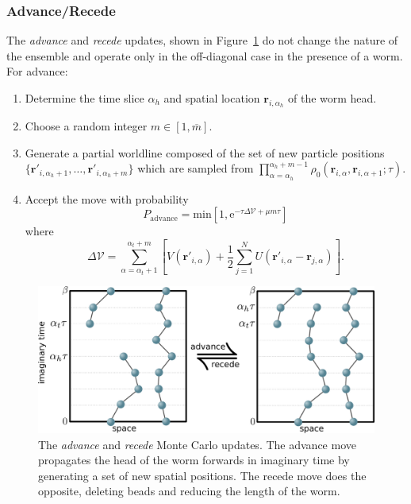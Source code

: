 \documentclass[prb,10pt,aps,floatfix,notitlepage]{revtex4-1}
\renewcommand{\vec}[1]{\boldsymbol{#1}}
\newcommand{\e}[1]{\mathrm{e}^{#1}}
\begin{document}
\subsubsection{Advance/Recede}
The \emph{advance} and \emph{recede} updates, shown in
 Figure~\ref{fig:advancerecede} do not change the nature of the
ensemble and operate only in the off-diagonal case in the presence of a worm.
For advance:
\begin{enumerate}
    \item Determine the time slice $\alpha_h$ and spatial location
        $\vec{r}_{i,\alpha_h}$ of the worm head.
    \item Choose a random integer $m \in [1,\overline{m}]$.
    \item Generate a partial worldline composed of the set of new particle positions 
        $\{\vec{r}'_{i,\alpha_h+1},\ldots, \vec{r}'_{i,\alpha_h+m}\}$ which are
        sampled from $\prod_{\alpha=\alpha_h}^{\alpha_h+m-1}
    \rho_0(\vec{r}_{i,\alpha},\vec{r}_{i,\alpha+1};\tau)$.
\item Accept the move with probability
\begin{equation}
    P_{\text{advance}} = \mathrm{min} \left[1,
    \e{-\tau \Delta \mathcal{V} + \mu m \tau} \right]
\end{equation}
%
where
%
\begin{equation}
    \Delta\mathcal{V} = \sum_{\alpha=\alpha_t+1}^{\alpha_t+m} \left[ 
        V(\vec{r}'_{i,\alpha}) + \frac{1}{2}\sum_{j=1}^N
        U(\vec{r}'_{i,\alpha}-\vec{r}_{j,\alpha}) \right].
\end{equation}
%
\end{enumerate}

%
\begin{figure}
\begin{center}
\includegraphics[width=0.70\columnwidth]{Figures/advancerecede.pdf}
\end{center}
\caption{The \emph{advance} and \emph{recede} Monte Carlo updates.  The advance
    move propagates the head of the worm forwards in imaginary time by
    generating a set of new spatial positions.  The recede move does the
opposite, deleting beads and reducing the length of the worm.}
\label{fig:advancerecede}
 \end{figure}
%
\end{document}
